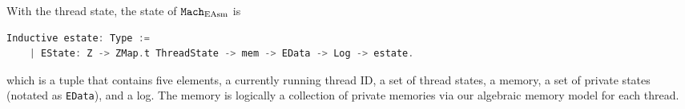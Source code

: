With the thread state,  the state of ${\mathrm{\texttt{Mach}}}_{\mathrm{EAsm}}$ is
\begin{lstlisting}[language=C]
  Inductive estate: Type :=
    | EState: Z -> ZMap.t ThreadState -> mem -> EData -> Log -> estate.
\end{lstlisting}
which is a tuple that contains five elements,
a currently running thread ID, a set of thread states, a memory, a set of private states (notated as \lstinline$EData$), and a log. 
The memory is logically a collection of private memories via our algebraic memory model for each thread.

%


